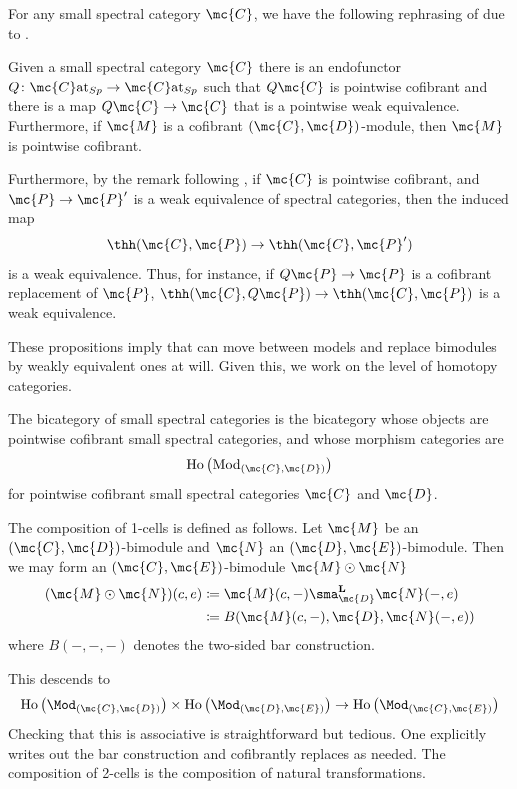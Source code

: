 \documentclass[11pt]{amsart}
\newcommand{\mbf}{\mathbf}
\begin{document}
For any small spectral category $\mc{C}$, we have the following rephrasing of \cite[Prop.~6.3]{schwede_shipley} due to \cite[Prop.~2.7, Prop.~2.8]{blumberg_mandell}.

\begin{prop}
	Given a small spectral category $\mc{C}$ there is an endofunctor $Q\colon  \mc{C}\text{at}_{Sp} \to \mc{C}\text{at}_{Sp}$ such that $Q \mc{C}$ is pointwise cofibrant and there is a map $Q \mc{C} \to \mc{C}$ that is a pointwise weak equivalence. Furthermore, if $\mc{M}$ is a cofibrant $(\mc{C}, \mc{D})$-module, then $\mc{M}$ is pointwise cofibrant. 
\end{prop}

Furthermore, by the remark following \cite[Prop.~3.6]{blumberg_mandell}, if $\mc{C}$ is pointwise cofibrant, and $\mc{P} \to \mc{P}'$ is a weak equivalence of spectral categories,
 then the induced map 
 \[
	\thh(\mc{C}, \mc{P}) \to \thh (\mc{C}, \mc{P}')
 \]
is a weak equivalence.  Thus, for instance, if $Q\mc{P} \to \mc{P}$ is a cofibrant replacement of $\mc{P}$, $\thh(\mc{C}, Q\mc{P}) \to \thh(\mc{C}, \mc{P})$ is a weak equivalence.

These propositions imply that can move  between models and replace bimodules by weakly equivalent ones at will. Given this, we work on the level of homotopy categories.



\begin{defn}
  The bicategory of small spectral categories is the bicategory whose objects are pointwise cofibrant small spectral categories, and whose morphism categories are 
\[
 \operatorname{Ho}\left(\operatorname{Mod}_{(\mc{C}, \mc{D})}\right)
\]
 for pointwise cofibrant small spectral categories $\mc{C}$ and $\mc{D}$.
\end{defn}

\begin{rmk} 
  The composition of 1-cells is defined as follows. Let $\mc{M}$ be an $(\mc{C}, \mc{D})$-bimodule and $\mc{N}$ an $(\mc{D},\mc{E})$-bimodule. Then we may form an $(\mc{C}, \mc{E})$-bimodule $\mc{M} \odot \mc{N}$
  \begin{align*}
    (\mc{M} \odot \mc{N})(c,e) &\coloneqq \mc{M}(c,-) \sma^{\mbf{L}}_{\mc{D}} \mc{N}(-,e)\\
    &\coloneqq B(\mc{M}(c,-), \mc{D}, \mc{N}(-,e))
  \end{align*}
  where $B(-,-,-)$ denotes the two-sided bar construction. 
  
  This descends to
  \[
  \operatorname{Ho}\left(\Mod_{(\mc{C}, \mc{D})}\right) \times \operatorname{Ho}\left(\Mod_{(\mc{D}, \mc{E})}\right) \to \operatorname{Ho}\left(\Mod_{(\mc{C}, \mc{E})}\right)
  \]
  Checking that this is associative is straightforward but tedious. One explicitly writes out the bar construction and cofibrantly replaces as needed.  The composition of 2-cells is the composition of natural transformations. 
\end{rmk} 
\end{document}

